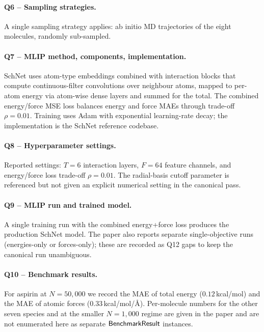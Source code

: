 \paragraph{Q6 -- Sampling strategies.}
A single sampling strategy applies: ab initio MD trajectories of the
eight molecules, randomly sub-sampled.


\paragraph{Q7 -- MLIP method, components, implementation.}
SchNet uses atom-type embeddings combined with interaction blocks
that compute continuous-filter convolutions over neighbour atoms,
mapped to per-atom energy via atom-wise dense layers and summed for
the total. The combined energy/force MSE loss balances energy and
force MAEs through trade-off $\rho=0.01$. Training uses Adam with
exponential learning-rate decay; the implementation is the SchNet
reference codebase.


\paragraph{Q8 -- Hyperparameter settings.}
Reported settings: $T=6$ interaction layers, $F=64$ feature channels,
and energy/force loss trade-off $\rho=0.01$. The radial-basis cutoff
parameter is referenced but not given an explicit numerical setting
in the canonical pass.


\paragraph{Q9 -- MLIP run and trained model.}
A single training run with the combined energy+force loss produces
the production SchNet model. The paper also reports separate
single-objective runs (energies-only or forces-only); these are
recorded as Q12 gaps to keep the canonical run unambiguous.


\paragraph{Q10 -- Benchmark results.}
For aspirin at $N=50{,}000$ we record the MAE of total energy
($0.12$\,kcal/mol) and the MAE of atomic forces
($0.33$\,kcal/mol/\AA). Per-molecule numbers for the other seven
species and at the smaller $N=1{,}000$ regime are given in the paper
and are not enumerated here as separate $\mathsf{BenchmarkResult}$
instances.


